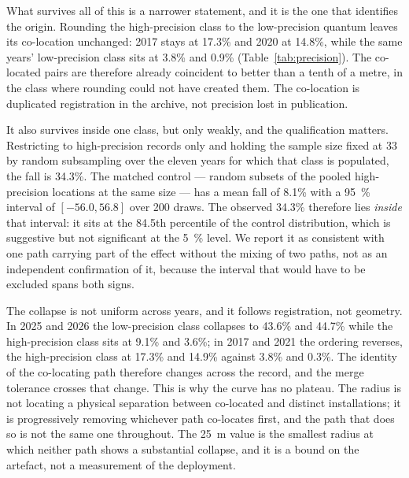 \documentclass[fleqn,10pt,lineno]{wlpeerj}
\begin{document}
What survives all of this is a narrower statement, and it is the one that identifies the origin.
Rounding the high-precision class to the low-precision quantum leaves its co-location unchanged:
2017 stays at \num{17.3}\% and 2020 at \num{14.8}\%, while the same years' low-precision class
sits at \num{3.8}\% and \num{0.9}\% (Table~\ref{tab:precision}). The co-located pairs are
therefore already coincident to better than a tenth of a metre, in the class where rounding could
not have created them. The co-location is duplicated registration in the archive, not
precision lost in publication.

It also survives inside one class, but only weakly, and the qualification matters. Restricting to
high-precision records only and holding the sample size fixed at \num{33} by random subsampling
over the eleven years for which that class is populated, the fall is \num{34.3}\%. The matched
control --- random subsets of the pooled high-precision locations at the same size --- has a mean
fall of \num{8.1}\% with a \SI{95}{\percent} interval of $[-56.0, 56.8]$ over \num{200} draws.
The observed \num{34.3}\% therefore lies \emph{inside} that interval: it sits at the
\num{84.5}th percentile of the control distribution, which is suggestive but not significant at
the \SI{5}{\percent} level. We report it as consistent with one path carrying part of the effect
without the mixing of two paths, not as an independent confirmation of it, because the interval
that would have to be excluded spans both signs.

The collapse is not uniform across years, and it follows registration, not geometry. In
2025 and 2026 the low-precision class collapses to \num{43.6}\% and \num{44.7}\% while the
high-precision class sits at \num{9.1}\% and \num{3.6}\%; in 2017 and 2021 the ordering reverses,
the high-precision class at \num{17.3}\% and \num{14.9}\% against \num{3.8}\% and \num{0.3}\%.
The identity of the co-locating path therefore changes across the record, and the merge tolerance
crosses that change. This is why the curve has no plateau. The radius is not locating a physical
separation between co-located and distinct installations; it is progressively removing whichever
path co-locates first, and the path that does so is not the same one throughout. The
\SI{25}{\meter} value is the smallest radius at which neither path shows a substantial collapse,
and it is a bound on the artefact, not a measurement of the deployment.
\end{document}
